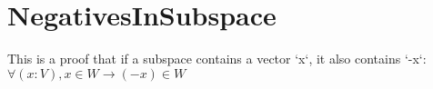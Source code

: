 \section{NegativesInSubspace}

\begin{theorem}
  \label{theorem : subspace_neg}
  \leanok
  This is a proof that if a subspace contains a vector `x`, it also contains `-x`:$ \forall (x : V), x \in W \rightarrow (-x) \in W$
\end{theorem}